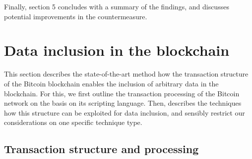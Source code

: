 \documentclass[a4paper,11pt,titlepage]{scrbook}
\begin{document}
Finally, section 5 concludes with a summary of the findings, and discusses potential improvements in the countermeasure.









\chapter{Data inclusion in the blockchain}

This section describes the state-of-the-art method how the transaction structure of the Bitcoin blockchain enables the inclusion of arbitrary data in the blockchain.
For this, we first outline the transaction processing of the Bitcoin network on the basis on its scripting language. Then, describes the techniques how this structure can be exploited for data inclusion, and sensibly restrict our considerations on one specific technique type.


\section{Transaction structure and processing}

\end{document}
